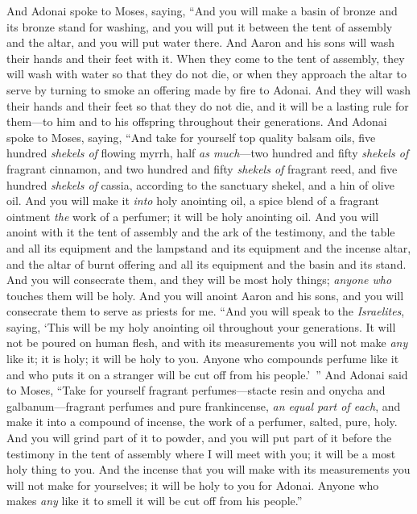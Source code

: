 \begin{biblechapter}
 And Adonai spoke to Moses, saying,
\verse “And you will make a basin of bronze and its bronze stand for washing, and you will put it between the tent of assembly and the altar, and you will put water there.
\verse And Aaron and his sons will wash their hands and their feet with it.
\verse When they come to the tent of assembly, they will wash with water so that they do not die, or when they approach the altar to serve by turning to smoke an offering made by fire to Adonai.
\verse And they will wash their hands and their feet so that they do not die, and it will be a lasting rule for them—to him and to his offspring throughout their generations.
 And Adonai spoke to Moses, saying,
\verse “And take for yourself top quality balsam oils, five hundred \textit{shekels of} flowing myrrh, half \textit{as much}—two hundred and fifty \textit{shekels of} fragrant cinnamon, and two hundred and fifty \textit{shekels of} fragrant reed,
\verse and five hundred \textit{shekels of} cassia, according to the sanctuary shekel, and a hin of olive oil.
\verse And you will make it \textit{into} holy anointing oil, a spice blend of a fragrant ointment \textit{the} work of a perfumer; it will be holy anointing oil.
\verse And you will anoint with it the tent of assembly and the ark of the testimony,
\verse and the table and all its equipment and the lampstand and its equipment and the incense altar,
\verse and the altar of burnt offering and all its equipment and the basin and its stand.
\verse And you will consecrate them, and they will be most holy things; \textit{anyone who} touches them will be holy.
\verse And you will anoint Aaron and his sons, and you will consecrate them to serve as priests for me.
\verse “And you will speak to the \textit{Israelites}, saying, ‘This will be my holy anointing oil throughout your generations.
\verse It will not be poured on human flesh, and with its measurements you will not make \textit{any} like it; it is holy; it will be holy to you.
\verse Anyone who compounds perfume like it and who puts it on a stranger will be cut off from his people.’ ”
\verse And Adonai said to Moses, “Take for yourself fragrant perfumes—stacte resin and onycha and galbanum—fragrant perfumes and pure frankincense, \textit{an equal part of each},
\verse and make it into a compound of incense, the work of a perfumer, salted, pure, holy.
\verse And you will grind part of it to powder, and you will put part of it before the testimony in the tent of assembly where I will meet with you; it will be a most holy thing to you.
\verse And the incense that you will make with its measurements you will not make for yourselves; it will be holy to you for Adonai.
\verse Anyone who makes \textit{any} like it to smell it will be cut off from his people.”
\end{biblechapter}

